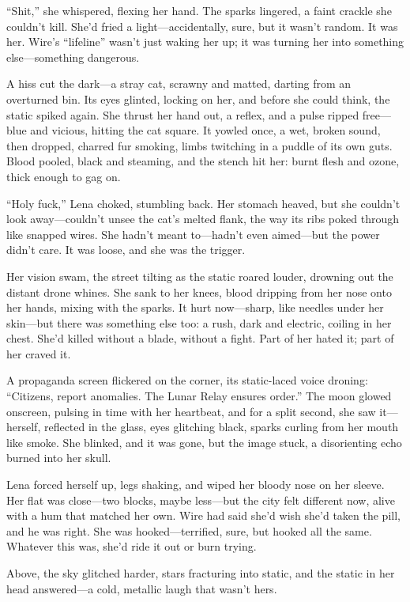 \documentclass[12pt]{book}
\begin{document}
``Shit,'' she whispered, flexing her hand. The sparks lingered, a faint crackle she couldn’t kill. She’d fried a light---accidentally, sure, but it wasn’t random. It was her. Wire’s ``lifeline'' wasn’t just waking her up; it was turning her into something else---something dangerous.

A hiss cut the dark---a stray cat, scrawny and matted, darting from an overturned bin. Its eyes glinted, locking on her, and before she could think, the static spiked again. She thrust her hand out, a reflex, and a pulse ripped free---blue and vicious, hitting the cat square. It yowled once, a wet, broken sound, then dropped, charred fur smoking, limbs twitching in a puddle of its own guts. Blood pooled, black and steaming, and the stench hit her: burnt flesh and ozone, thick enough to gag on.

``Holy fuck,'' Lena choked, stumbling back. Her stomach heaved, but she couldn’t look away---couldn’t unsee the cat’s melted flank, the way its ribs poked through like snapped wires. She hadn’t meant to---hadn’t even aimed---but the power didn’t care. It was loose, and she was the trigger.

Her vision swam, the street tilting as the static roared louder, drowning out the distant drone whines. She sank to her knees, blood dripping from her nose onto her hands, mixing with the sparks. It hurt now---sharp, like needles under her skin---but there was something else too: a rush, dark and electric, coiling in her chest. She’d killed without a blade, without a fight. Part of her hated it; part of her craved it.

A propaganda screen flickered on the corner, its static-laced voice droning: ``Citizens, report anomalies. The Lunar Relay ensures order.'' The moon glowed onscreen, pulsing in time with her heartbeat, and for a split second, she saw it---herself, reflected in the glass, eyes glitching black, sparks curling from her mouth like smoke. She blinked, and it was gone, but the image stuck, a disorienting echo burned into her skull.

Lena forced herself up, legs shaking, and wiped her bloody nose on her sleeve. Her flat was close---two blocks, maybe less---but the city felt different now, alive with a hum that matched her own. Wire had said she’d wish she’d taken the pill, and he was right. She was hooked---terrified, sure, but hooked all the same. Whatever this was, she’d ride it out or burn trying.

Above, the sky glitched harder, stars fracturing into static, and the static in her head answered---a cold, metallic laugh that wasn’t hers.
\end{document}
